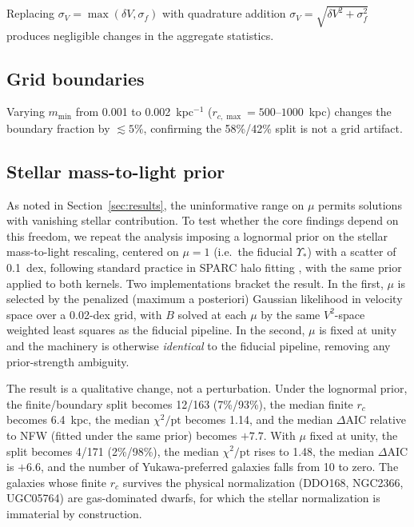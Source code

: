 \documentclass[11pt,a4paper]{article}
\begin{document}
Replacing $\sigma_V = \max(\delta V, \sigma_f)$ with quadrature
addition $\sigma_V = \sqrt{\delta V^2 + \sigma_f^2}$ produces
negligible changes in the aggregate statistics.

\subsection{Grid boundaries}

Varying $m_{\min}$ from 0.001 to 0.002~kpc$^{-1}$
($r_{c,\max} = 500$--$1000$~kpc) changes the boundary fraction
by $\lesssim 5\%$, confirming the 58\%/42\% split is not a
grid artifact.

\subsection{Stellar mass-to-light prior}
\label{sec:ml-prior}

As noted in Section~\ref{sec:results}, the uninformative range on
$\mu$ permits solutions with vanishing stellar contribution.
To test whether the core findings depend on this freedom, we
repeat the analysis imposing a lognormal prior on the stellar
mass-to-light rescaling, centered on $\mu = 1$
(i.e.\ the fiducial $\Upsilon_*$) with a scatter of 0.1~dex,
following standard practice in SPARC halo fitting
\cite{Li:2020iib}, with the same prior applied to both kernels.
Two implementations bracket the result.
In the first, $\mu$ is selected by the penalized (maximum a
posteriori) Gaussian likelihood in velocity space over a
0.02-dex grid, with $B$ solved at each $\mu$ by the same
$V^2$-space weighted least squares as the fiducial pipeline.
In the second, $\mu$ is fixed at unity and the machinery is
otherwise \emph{identical} to the fiducial pipeline, removing any
prior-strength ambiguity.

The result is a qualitative change, not a perturbation.
Under the lognormal prior, the finite/boundary split becomes
12/163 (7\%/93\%), the median finite $r_c$ becomes 6.4~kpc, the
median $\chi^2/\mathrm{pt}$ becomes 1.14, and the median
$\Delta\mathrm{AIC}$ relative to NFW (fitted under the same
prior) becomes $+7.7$.
With $\mu$ fixed at unity, the split becomes 4/171 (2\%/98\%),
the median $\chi^2/\mathrm{pt}$ rises to 1.48, the median
$\Delta\mathrm{AIC}$ is $+6.6$, and the number of
Yukawa-preferred galaxies falls from 10 to zero.
The galaxies whose finite $r_c$ survives the physical
normalization (DDO168, NGC2366, UGC05764) are gas-dominated
dwarfs, for which the stellar normalization is immaterial by
construction.
\end{document}
